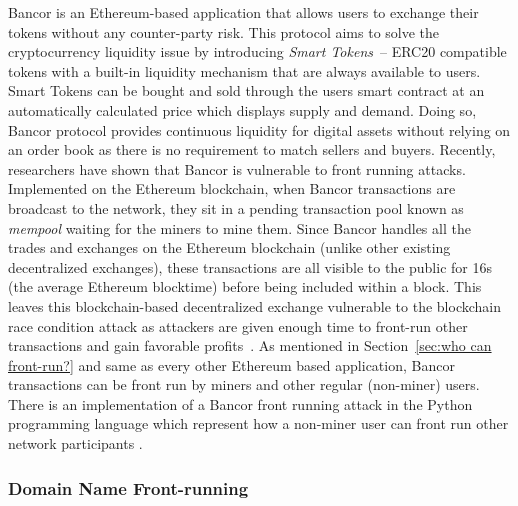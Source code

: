 Bancor is an Ethereum-based application that allows users to exchange their tokens without any counter-party risk. This protocol aims to solve the cryptocurrency liquidity issue by introducing \textit{Smart Tokens}~\cite{hertzog2017bancor}-- ERC20 compatible tokens with a built-in liquidity mechanism that are always available to users. Smart Tokens can be bought and sold through the users smart contract at an automatically calculated price which displays supply and demand. Doing so, Bancor protocol provides continuous liquidity for digital assets without relying on an order book as there is no requirement to match sellers and buyers.
Recently, researchers have shown that Bancor is vulnerable to front running attacks. Implemented on the Ethereum blockchain, when Bancor transactions are broadcast to the network, they sit in a pending transaction pool known as \textit{mempool} waiting for the miners to mine them. Since Bancor handles all the trades and exchanges on the Ethereum blockchain (unlike other existing decentralized exchanges), these transactions are all visible to the public for 16s (the average Ethereum blocktime) before being included within a block. This leaves this blockchain-based decentralized exchange vulnerable to the blockchain race condition attack as attackers are given enough time to front-run other transactions and gain favorable profits~\cite{BancorIs7:online}. As mentioned in Section~\ref{sec:who can front-run?} and same as every other Ethereum based application, Bancor transactions can be front run by miners and other regular (non-miner) users. There is an implementation of a Bancor front running attack in the Python programming language which represent how a non-miner user can front run other network participants \cite{NewTab13:online}.



\subsubsection{Domain Name Front-running} \hfill\\    

